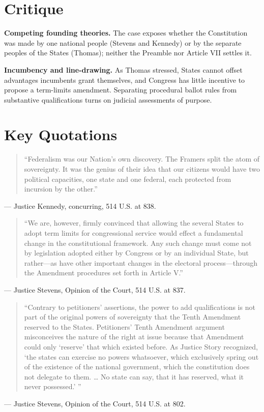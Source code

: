 \documentclass[12pt]{article}
\begin{document}
\section{Critique}

\textbf{Competing founding theories.} The case exposes whether the Constitution was made by one national people (Stevens and Kennedy) or by the separate peoples of the States (Thomas); neither the Preamble nor Article VII settles it.

\textbf{Incumbency and line-drawing.} As Thomas stressed, States cannot offset advantages incumbents grant themselves, and Congress has little incentive to propose a term-limits amendment. Separating procedural ballot rules from substantive qualifications turns on judicial assessments of purpose.

\section{Key Quotations}

\begin{quote}
``Federalism was our Nation's own discovery. The Framers split the atom of sovereignty. It was the genius of their idea that our citizens would have two political capacities, one state and one federal, each protected from incursion by the other.''
\end{quote}
\noindent --- Justice Kennedy, concurring, 514 U.S. at 838.

\begin{quote}
``We are, however, firmly convinced that allowing the several States to adopt term limits for congressional service would effect a fundamental change in the constitutional framework. Any such change must come not by legislation adopted either by Congress or by an individual State, but rather---as have other important changes in the electoral process---through the Amendment procedures set forth in Article V.''
\end{quote}
\noindent --- Justice Stevens, Opinion of the Court, 514 U.S. at 837.

\begin{quote}
``Contrary to petitioners' assertions, the power to add qualifications is not part of the original powers of sovereignty that the Tenth Amendment reserved to the States. Petitioners' Tenth Amendment argument misconceives the nature of the right at issue because that Amendment could only `reserve' that which existed before. As Justice Story recognized, `the states can exercise no powers whatsoever, which exclusively spring out of the existence of the national government, which the constitution does not delegate to them. \ldots{} No state can say, that it has reserved, what it never possessed.' ''
\end{quote}
\noindent --- Justice Stevens, Opinion of the Court, 514 U.S. at 802.
\end{document}
